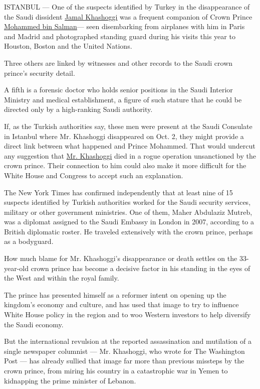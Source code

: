 ISTANBUL --- One of the suspects identified by Turkey in the
disappearance of the Saudi dissident
\href{https://www.nytimes.com/2018/10/16/us/politics/khashoggi-trump-iran-sanctions.html}{Jamal
Khashoggi} was a frequent companion of Crown Prince
\href{https://www.nytimes.com/2018/10/16/us/politics/khashoggi-trump-iran-sanctions.html}{Mohammed
bin Salman}--- seen disembarking from airplanes with him in Paris and
Madrid and photographed standing guard during his visits this year to
Houston, Boston and the United Nations.

Three others are linked by witnesses and other records to the Saudi
crown prince's security detail.

A fifth is a forensic doctor who holds senior positions in the Saudi
Interior Ministry and medical establishment, a figure of such stature
that he could be directed only by a high-ranking Saudi authority.

If, as the Turkish authorities say, these men were present at the Saudi
Consulate in Istanbul where Mr. Khashoggi disappeared on Oct. 2, they
might provide a direct link between what happened and Prince Mohammed.
That would undercut any suggestion that
\href{https://www.nytimes.com/2018/10/16/us/politics/khashoggi-trump-iran-sanctions.html}{Mr.
Khashoggi} died in a rogue operation unsanctioned by the crown prince.
Their connection to him could also make it more difficult for the White
House and Congress to accept such an explanation.

The New York Times has confirmed independently that at least nine of 15
suspects identified by Turkish authorities worked for the Saudi security
services, military or other government ministries. One of them, Maher
Abdulaziz Mutreb, was a diplomat assigned to the Saudi Embassy in London
in 2007, according to a British diplomatic roster. He traveled
extensively with the crown prince, perhaps as a bodyguard.

How much blame for Mr. Khashoggi's disappearance or death settles on the
33-year-old crown prince has become a decisive factor in his standing in
the eyes of the West and within the royal family.

The prince has presented himself as a reformer intent on opening up the
kingdom's economy and culture, and has used that image to try to
influence White House policy in the region and to woo Western investors
to help diversify the Saudi economy.

But the international revulsion at the reported assassination and
mutilation of a single newspaper columnist --- Mr. Khashoggi, who wrote
for The Washington Post --- has already sullied that image far more than
previous missteps by the crown prince, from miring his country in a
catastrophic war in Yemen to kidnapping the prime minister of Lebanon.

